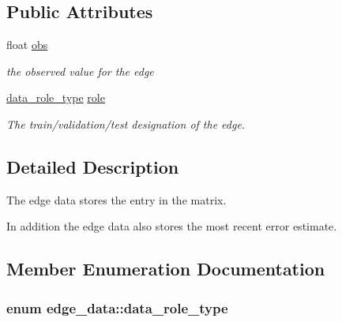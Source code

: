 \subsection*{Public Attributes}
\begin{DoxyCompactItemize}
\item 
\hypertarget{structedge__data_a1fc50f971f9fdbb4c9c90e33bda1c758}{float \hyperlink{structedge__data_a1fc50f971f9fdbb4c9c90e33bda1c758}{obs}}\label{structedge__data_a1fc50f971f9fdbb4c9c90e33bda1c758}

\begin{DoxyCompactList}\small\item\em the observed value for the edge \end{DoxyCompactList}\item 
\hypertarget{structedge__data_a3fbba49eb9690a4fdeeda275d6c9cad9}{\hyperlink{structedge__data_a058121c45cac9d350dd70939a023b55d}{data\-\_\-role\-\_\-type} \hyperlink{structedge__data_a3fbba49eb9690a4fdeeda275d6c9cad9}{role}}\label{structedge__data_a3fbba49eb9690a4fdeeda275d6c9cad9}

\begin{DoxyCompactList}\small\item\em The train/validation/test designation of the edge. \end{DoxyCompactList}\end{DoxyCompactItemize}


\subsection{Detailed Description}
The edge data stores the entry in the matrix. 

In addition the edge data also stores the most recent error estimate. 

\subsection{Member Enumeration Documentation}
\hypertarget{structedge__data_a058121c45cac9d350dd70939a023b55d}{
\subsubsection[{data\-\_\-role\-\_\-type}]{\setlength{\rightskip}{0pt plus 5cm}enum {\bf edge\-\_\-data\-::data\-\_\-role\-\_\-type}}}\label{structedge__data_a058121c45cac9d350dd70939a023b55d}


